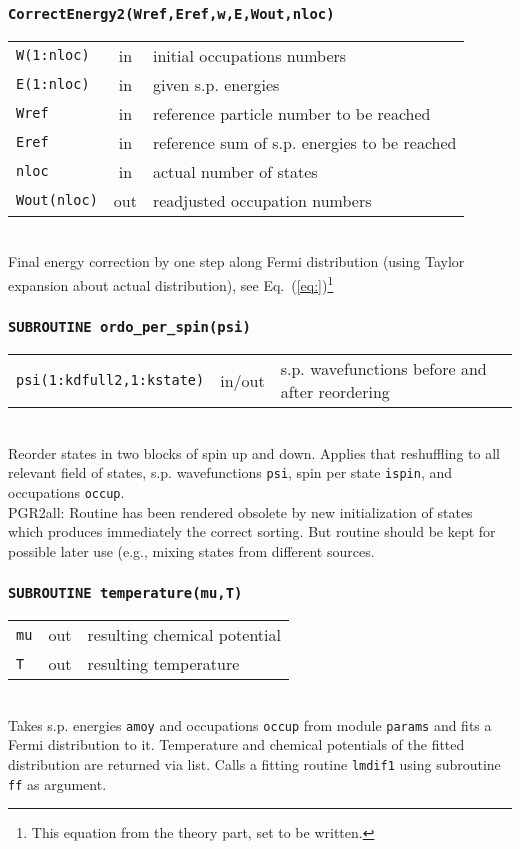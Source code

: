 \documentclass[final,1p]{elsarticle}
\newcommand{\PGRcomm}[1]{{\color{blue}\small PGR2all: #1}}
\newcommand{\PGRfoot}[1]{{\color{blue}\footnote{\color{blue} #1}}}
\begin{document}
\subsubsection*{\tt CorrectEnergy2(Wref,Eref,w,E,Wout,nloc)}
\begin{tabular}{lcl}
 {\tt W(1:nloc)} & in & initial occupations numbers\\
 {\tt E(1:nloc)} & in & given s.p. energies\\
 {\tt Wref} & in & reference particle number to be reached\\
 {\tt Eref} & in &  reference sum of s.p. energies to be reached\\
 {\tt nloc} & in & actual number of states\\
 {\tt Wout(nloc)} & out  & readjusted occupation numbers\\
\end{tabular}
\\[4pt]
Final energy correction by one step along Fermi distribution
(using Taylor expansion about actual distribution),
see Eq.~(\ref{eq:})\PGRfoot{This equation from the
  theory part, set to be written.}



\subsubsection*{\tt SUBROUTINE ordo\_per\_spin(psi)}
\begin{tabular}{lcl}
 {\tt psi(1:kdfull2,1:kstate)} & in/out & s.p. wavefunctions before
 and after reordering\\
\end{tabular}
\\[4pt]
Reorder states  in two blocks of spin up and down.
Applies that reshuffling to all relevant field of states,
s.p. wavefunctions {\tt psi}, spin per state {\tt ispin},
and occupations {\tt occup}. 
\\
\PGRcomm{Routine has been rendered obsolete by new initialization of
  states which produces immediately the correct sorting. But routine
  should be kept for possible later use (e.g., mixing states from
  different sources.}

\subsubsection*{\tt SUBROUTINE temperature(mu,T)}
\begin{tabular}{lcl}
 {\tt mu} & out & resulting chemical potential\\
 {\tt T} & out & resulting temperature\\
\end{tabular}
\\[4pt]
Takes s.p. energies {\tt amoy} and occupations {\tt occup} from module
{\tt params} and fits a Fermi distribution to it. Temperature and
chemical potentials of the fitted distribution are returned via list.
Calls a fitting routine {\tt lmdif1} using subroutine {\tt ff} as argument.
\end{document}
